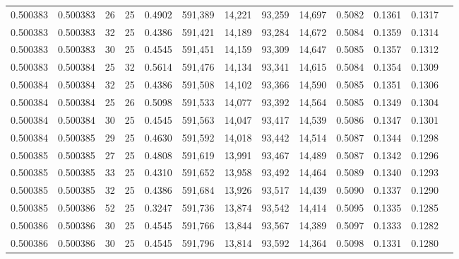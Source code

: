 \begin{tabular}{rrrrrrrrrrrrr}
0.500383 & 0.500383 &    26 &  25 &                                     0.4902 & 591,389 &  14,221 &  93,259 &  14,697 & 0.5082 & 0.1361 & 0.1317 \\
0.500383 & 0.500383 &    32 &  25 &                                     0.4386 & 591,421 &  14,189 &  93,284 &  14,672 & 0.5084 & 0.1359 & 0.1314 \\
0.500383 & 0.500383 &    30 &  25 &                                     0.4545 & 591,451 &  14,159 &  93,309 &  14,647 & 0.5085 & 0.1357 & 0.1312 \\
0.500383 & 0.500384 &    25 &  32 &                                     0.5614 & 591,476 &  14,134 &  93,341 &  14,615 & 0.5084 & 0.1354 & 0.1309 \\
0.500384 & 0.500384 &    32 &  25 &                                     0.4386 & 591,508 &  14,102 &  93,366 &  14,590 & 0.5085 & 0.1351 & 0.1306 \\
0.500384 & 0.500384 &    25 &  26 &                                     0.5098 & 591,533 &  14,077 &  93,392 &  14,564 & 0.5085 & 0.1349 & 0.1304 \\
0.500384 & 0.500384 &    30 &  25 &                                     0.4545 & 591,563 &  14,047 &  93,417 &  14,539 & 0.5086 & 0.1347 & 0.1301 \\
0.500384 & 0.500385 &    29 &  25 &                                     0.4630 & 591,592 &  14,018 &  93,442 &  14,514 & 0.5087 & 0.1344 & 0.1298 \\
0.500385 & 0.500385 &    27 &  25 &                                     0.4808 & 591,619 &  13,991 &  93,467 &  14,489 & 0.5087 & 0.1342 & 0.1296 \\
0.500385 & 0.500385 &    33 &  25 &                                     0.4310 & 591,652 &  13,958 &  93,492 &  14,464 & 0.5089 & 0.1340 & 0.1293 \\
0.500385 & 0.500385 &    32 &  25 &                                     0.4386 & 591,684 &  13,926 &  93,517 &  14,439 & 0.5090 & 0.1337 & 0.1290 \\
0.500385 & 0.500386 &    52 &  25 &                                     0.3247 & 591,736 &  13,874 &  93,542 &  14,414 & 0.5095 & 0.1335 & 0.1285 \\
0.500386 & 0.500386 &    30 &  25 &                                     0.4545 & 591,766 &  13,844 &  93,567 &  14,389 & 0.5097 & 0.1333 & 0.1282 \\
0.500386 & 0.500386 &    30 &  25 &                                     0.4545 & 591,796 &  13,814 &  93,592 &  14,364 & 0.5098 & 0.1331 & 0.1280 \\

\end{tabular}
